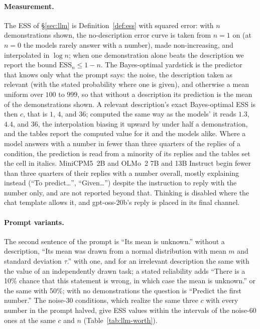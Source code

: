 \documentclass{article}
\newcommand{\ess}{\mathrm{ESS}}
\begin{document}
\paragraph{Measurement.} The ESS of \S\ref{sec:llm} is Definition~\ref{def:ess} with squared error: with $n$ demonstrations shown, the no-description error curve is taken from $n = 1$ on (at $n = 0$ the models rarely answer with a number), made non-increasing, and interpolated in $\log n$; when one demonstration alone beats the description we report the bound $\ess_n \le 1 - n$. The Bayes-optimal yardstick is the predictor that knows only what the prompt says: the noise, the description taken as relevant (with the stated probability where one is given), and otherwise a mean uniform over $100$ to $999$, so that without a description its prediction is the mean of the demonstrations shown. A relevant description's exact Bayes-optimal ESS is then $c$, that is $1$, $4$, and $36$; computed the same way as the models' it reads $1.3$, $4.4$, and $36$, the interpolation biasing it upward by under half a demonstration, and the tables report the computed value for it and the models alike. Where a model answers with a number in fewer than three quarters of the replies of a condition, the prediction is read from a minority of its replies and the tables set the cell in italics. MiniCPM5~2B \citep{minicpm5} and OLMo~2 7B and 13B Instruct begin fewer than three quarters of their replies with a number overall, mostly explaining instead (``To predict\ldots'', ``Given\ldots'') despite the instruction to reply with the number only, and are not reported beyond that. Thinking is disabled where the chat template allows it, and gpt-oss-20b's reply is placed in its final channel.

\paragraph{Prompt variants.} The second sentence of the prompt is ``Its mean is unknown.'' without a description, ``Its mean was drawn from a normal distribution with mean $m$ and standard deviation $\tau$.'' with one, and for an irrelevant description the same with the value of an independently drawn task; a stated reliability adds ``There is a 10\% chance that this statement is wrong, in which case the mean is unknown.'' or the same with 50\%; with no demonstrations the question is ``Predict the first number.'' The noise-$30$ conditions, which realize the same three $c$ with every number in the prompt halved, give ESS values within the intervals of the noise-$60$ ones at the same $c$ and $n$ (Table~\ref{tab:llm-worth}).
\end{document}
